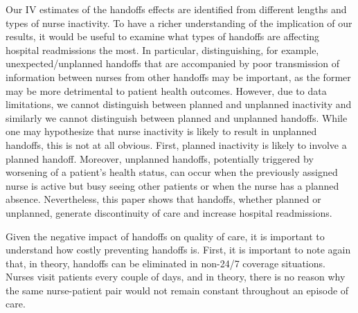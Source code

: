 \documentclass[final,12pt, notitlepage]{article}
\begin{document}
Our IV estimates of the handoffs effects are identified from different lengths and types of nurse inactivity. To have a richer understanding of the implication of our results, it would be useful to examine what types of handoffs are affecting hospital readmissions the most. In particular, distinguishing, for example, unexpected/unplanned handoffs that are accompanied by poor transmission of information between nurses from other handoffs may be important, as the former may be more detrimental to patient health outcomes. However, due to data limitations, we cannot distinguish between planned and unplanned inactivity and similarly we cannot distinguish between planned and unplanned handoffs. While one may hypothesize that nurse inactivity is likely to result in unplanned handoffs, this is not at all obvious. First, planned inactivity is likely to involve a planned handoff. Moreover, unplanned handoffs, potentially triggered by worsening of a patient's health status, can occur when the previously assigned nurse is active but busy seeing other patients or when the nurse has a planned absence. Nevertheless, this paper shows that handoffs, whether planned or unplanned, generate discontinuity of care and increase hospital readmissions.

Given the negative impact of handoffs on quality of care, it is important to understand how costly preventing handoffs is. First, it is important to note again that, in theory, handoffs can be eliminated in non-24/7 coverage situations. Nurses visit patients every couple of days, and in theory, there is no reason why the same nurse-patient pair would not remain constant throughout an episode of care.
\end{document}
